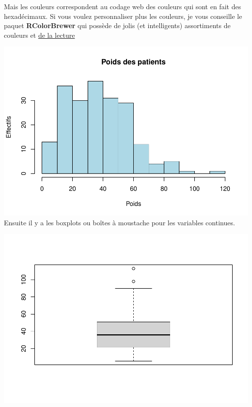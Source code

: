 \documentclass[
]{book}
\newenvironment{Shaded}{\begin{snugshade}}{\end{snugshade}}
\newcommand{\AttributeTok}[1]{\textcolor[rgb]{0.13,0.29,0.53}{#1}}
\newcommand{\FunctionTok}[1]{\textcolor[rgb]{0.13,0.29,0.53}{\textbf{#1}}}
\newcommand{\NormalTok}[1]{#1}
\newcommand{\SpecialCharTok}[1]{\textcolor[rgb]{0.81,0.36,0.00}{\textbf{#1}}}
\newcommand{\StringTok}[1]{\textcolor[rgb]{0.31,0.60,0.02}{#1}}
\begin{document}
Mais les couleurs correspondent au codage web des couleurs qui sont en fait des
hexadécimaux. Si vous voulez personnaliser plus les couleurs, je vous conseille
le paquet \textbf{RColorBrewer} qui possède de jolis (et intelligents) assortiments
de couleurs et \href{https://larmarange.github.io/analyse-R/couleurs.html}{de la lecture}

\begin{Shaded}
\end{Shaded}

\includegraphics{_main_files/figure-latex/unnamed-chunk-73-1.pdf}
Ensuite il y a les boxplots ou boîtes à moustache pour les variables continues.

\begin{Shaded}
\end{Shaded}

\includegraphics{_main_files/figure-latex/poids4-1.pdf}
\end{document}
